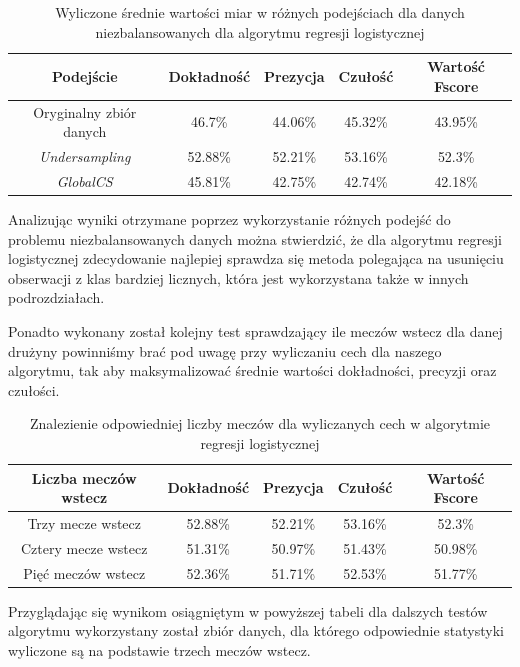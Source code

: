 \begin{table}[H]
    \centering
    \caption{Wyliczone średnie wartości miar w różnych podejściach dla danych niezbalansowanych dla algorytmu regresji logistycznej}
    \label{tab:LRSampling}
    \begin{tabular}{| c | c | c | c | c |}
    \hline
        Podejście & Dokładność & Prezycja & Czułość & Wartość Fscore \\ \hline 
        \hline
        Oryginalny zbiór danych & 46.7\% & 44.06\% & 45.32\% & 43.95\% \\
        \hline
        \textit{Undersampling} & 52.88\% & 52.21\% & 53.16\% & 52.3\% \\
        \hline
        \textit{GlobalCS} & 45.81\% & 42.75\% & 42.74\% & 42.18\% \\
         \hline
    \end{tabular}
\end{table}

Analizując wyniki otrzymane poprzez wykorzystanie różnych podejść do problemu niezbalansowanych danych można stwierdzić, że dla algorytmu regresji logistycznej zdecydowanie najlepiej sprawdza się metoda polegająca na usunięciu obserwacji z klas bardziej licznych, która jest wykorzystana także w innych podrozdziałach.

Ponadto wykonany został kolejny test sprawdzający ile meczów wstecz dla danej drużyny powinniśmy brać pod uwagę przy wyliczaniu cech dla naszego algorytmu, tak aby maksymalizować średnie wartości dokładności, precyzji oraz czułości.

\begin{table}[H]
    \centering
    \caption{Znalezienie odpowiedniej liczby meczów dla wyliczanych cech w algorytmie regresji logistycznej}
    \begin{tabular}{| c | c | c | c | c |}
    \hline
        Liczba meczów wstecz & Dokładność & Prezycja & Czułość & Wartość Fscore \\ \hline 
        \hline
        Trzy mecze wstecz & 52.88\% & 52.21\% & 53.16\% & 52.3\% \\
        \hline
        Cztery mecze wstecz & 51.31\% & 50.97\% & 51.43\% & 50.98\% \\
        \hline
        Pięć meczów wstecz & 52.36\% & 51.71\% & 52.53\% & 51.77\% \\
         \hline
    \end{tabular}
\end{table}

Przyglądając się wynikom osiągniętym w powyższej tabeli dla dalszych testów algorytmu wykorzystany został zbiór danych, dla którego odpowiednie statystyki wyliczone są na podstawie trzech meczów wstecz.

